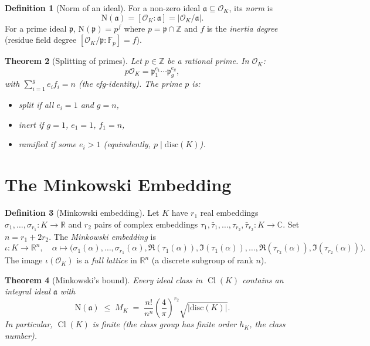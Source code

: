 \documentclass[12pt,a4paper]{amsart}
\newtheorem{theorem}{Theorem}[section]
\theoremstyle{definition}
\newtheorem{definition}[theorem]{Definition}
\newcommand{\Z}{\mathbb{Z}}
\newcommand{\R}{\mathbb{R}}
\newcommand{\C}{\mathbb{C}}
\newcommand{\F}{\mathbb{F}}
\newcommand{\OK}{\mathcal{O}_K}
\newcommand{\p}{\mathfrak{p}}
\newcommand{\aaa}{\mathfrak{a}}
\newcommand{\Nm}{\mathrm{N}}
\newcommand{\disc}{\mathrm{disc}}
\DeclareMathOperator{\Cl}{Cl}
\begin{document}
\begin{definition}[Norm of an ideal]
\label{def:ideal_norm}
For a non-zero ideal $\aaa \subseteq \OK$, its \emph{norm} is
\[
  \Nm(\aaa) = [\OK : \aaa] = |\OK/\aaa|.
\]
For a prime ideal $\p$, $\Nm(\p) = p^f$ where $p = \p \cap \Z$ and $f$
is the \emph{inertia degree} (residue field degree $[\OK/\p : \F_p] = f$).
\end{definition}

\begin{theorem}[Splitting of primes]
\label{thm:splitting}
Let $p \in \Z$ be a rational prime.  In $\OK$:
\[
  p\OK = \p_1^{e_1} \cdots \p_g^{e_g},
\]
with $\sum_{i=1}^g e_i f_i = n$ (the \emph{efg-identity}).
The prime $p$ is:
\begin{itemize}
  \item \emph{split} if all $e_i = 1$ and $g = n$,
  \item \emph{inert} if $g = 1$, $e_1 = 1$, $f_1 = n$,
  \item \emph{ramified} if some $e_i > 1$ (equivalently, $p \mid \disc(K)$).
\end{itemize}
\end{theorem}

\section{The Minkowski Embedding}

\begin{definition}[Minkowski embedding]
\label{def:mink_emb}
Let $K$ have $r_1$ real embeddings $\sigma_1, \ldots, \sigma_{r_1} : K \to \R$
and $r_2$ pairs of complex embeddings
$\tau_1, \bar\tau_1, \ldots, \tau_{r_2}, \bar\tau_{r_2} : K \to \C$.
Set $n = r_1 + 2r_2$.  The \emph{Minkowski embedding} is
\[
  \iota : K \longrightarrow \R^n, \quad
  \alpha \longmapsto
  \bigl(\sigma_1(\alpha), \ldots, \sigma_{r_1}(\alpha),
        \Re(\tau_1(\alpha)), \Im(\tau_1(\alpha)), \ldots,
        \Re(\tau_{r_2}(\alpha)), \Im(\tau_{r_2}(\alpha))\bigr).
\]
The image $\iota(\OK)$ is a \emph{full lattice} in $\R^n$ (a discrete
subgroup of rank $n$).
\end{definition}

\begin{theorem}[Minkowski's bound]
\label{thm:mink_bound}
Every ideal class in $\Cl(K)$ contains an integral ideal $\aaa$ with
\[
  \Nm(\aaa) \;\le\; M_K
  \;=\; \frac{n!}{n^n} \left(\frac{4}{\pi}\right)^{r_2} \sqrt{|\disc(K)|}.
\]
In particular, $\Cl(K)$ is \emph{finite} (the \emph{class group} has finite
order $h_K$, the \emph{class number}).
\end{theorem}
\end{document}
